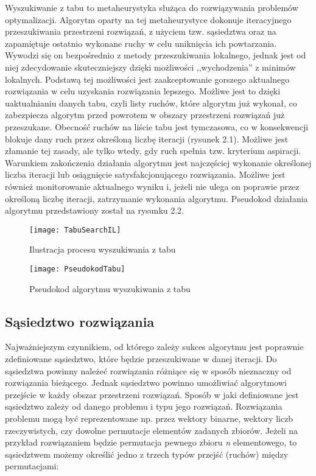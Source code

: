 Wyszukiwanie z tabu to metaheurystyka służąca do rozwiązywania problemów optymalizacji. Algorytm oparty na tej metaheurystyce dokonuje iteracyjnego przeszukiwania przestrzeni rozwiązań, z użyciem tzw. sąsiedztwa oraz na zapamiętuje ostatnio wykonane ruchy w celu uniknięcia ich powtarzania. Wywodzi się on bezpośrednio z metody przeszukiwania lokalnego, jednak jest od niej zdecydowanie skuteczniejszy dzięki możliwości ,,wychodzenia'' z minimów lokalnych. Podstawą tej możliwości jest zaakceptowanie gorszego aktualnego rozwiązania w celu uzyskania rozwiązania lepszego. Możliwe jest to dzięki uaktualnianiu danych tabu, czyli listy ruchów, które algorytm już wykonał, co zabezpiecza algorytm przed powrotem w obszary przestrzeni rozwiązań już przeszukane. Obecność ruchów na liście tabu jest tymczasowa, co w konsekwencji blokuje dany ruch przez określoną liczbę iteracji (rysunek 2.1). Możliwe jest złamanie tej zasady, ale tylko wtedy, gdy ruch spełnia tzw. kryterium aspiracji. Warunkiem zakończenia działania algorytmu jest najczęściej wykonanie określonej liczba iteracji lub osiągnięcie satysfakcjonującego rozwiązania. Możliwe jest również monitorowanie aktualnego wyniku i, jeżeli nie ulega on poprawie przez określoną liczbę iteracji, zatrzymanie wykonania algorytmu. Pseudokod działania algorytmu przedstawiony został na rysunku 2.2.

\begin{figure}
	\centering
	\texttt{[image: TabuSearchIL]}
	\caption{Ilustracja procesu wyszukiwania z tabu}
	\label{fig: TabuSearchIL}
\end{figure}

\begin{figure}
	\centering
	\texttt{[image: PseudokodTabu]}
	\caption{Pseudokod algorytmu wyszukiwania z tabu}
	\label{fig: AlgorytmTabu}
\end{figure}

\subsection{Sąsiedztwo rozwiązania}

Najważniejszym czynnikiem, od którego zależy sukces algorytmu jest poprawnie zdefiniowane sąsiedztwo, które będzie przeszukiwane w danej iteracji. Do sąsiedztwa powinny należeć rozwiązania różniące się w sposób nieznaczny od rozwiązania bieżącego. Jednak sąsiedztwo powinno umożliwiać algorytmowi przejście w każdy obszar przestrzeni rozwiązań. Sposób w jaki definiowane jest sąsiedztwo zależy od danego problemu i typu jego rozwiązań. Rozwiązania problemu mogą być reprezentowane np. przez wektory binarne, wektory liczb rzeczywistych, czy dowolne permutacje elementów zadanych zbiorów. Jeżeli na przykład rozwiązaniem będzie permutacja pewnego zbioru \textit{n} elementowego, to sąsiedztwem możemy określić jedno z trzech typów przejść (ruchów) między permutacjami:


